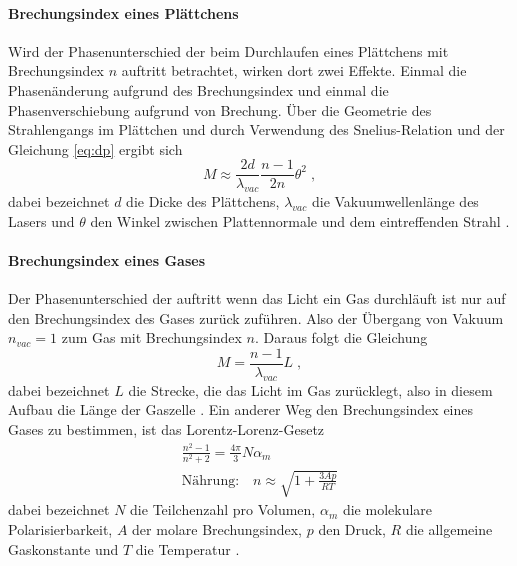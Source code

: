 \paragraph{Brechungsindex eines Plättchens}
Wird der Phasenunterschied der beim Durchlaufen eines Plättchens mit Brechungsindex $n$ auftritt betrachtet,
wirken dort zwei Effekte. Einmal die Phasenänderung aufgrund des Brechungsindex und einmal die
Phasenverschiebung aufgrund von Brechung. Über die Geometrie des Strahlengangs im Plättchen und durch
Verwendung des Snelius-Relation und der Gleichung \eqref{eq:dp} ergibt sich
\begin{equation}
M \approx \frac{2d}{\lambda_{vac}} \frac{n-1}{2n} \theta^2 \; ,
\label{eq:pM}
\end{equation}
dabei bezeichnet $d$ die Dicke des Plättchens, $\lambda_{vac}$ die Vakuumwellenlänge des Lasers und $\theta$ den
Winkel zwischen Plattennormale und dem eintreffenden Strahl \cite{Anleitung}.
\paragraph{Brechungsindex eines Gases}
Der Phasenunterschied der auftritt wenn das Licht ein Gas durchläuft ist nur auf den Brechungsindex des
Gases zurück zuführen. Also der Übergang von Vakuum $n_{vac}= 1$ zum Gas mit Brechungsindex $n$. Daraus folgt
die Gleichung
\begin{equation}
M = \frac{n-1}{\lambda_{vac}} L \; ,
\label{eq:lM}
\end{equation}
dabei bezeichnet $L$ die Strecke, die das Licht im Gas zurücklegt, also in diesem Aufbau die Länge der Gaszelle
\cite{Anleitung}. Ein anderer Weg den Brechungsindex eines Gases zu bestimmen, ist das Lorentz-Lorenz-Gesetz
\begin{gather}
\frac{n^2 -1}{n^2 +2} = \frac{4\pi}{3} N \alpha_m \\
\text{Nährung:} \quad n \approx \sqrt{1+ \frac{3Ap}{RT}}
\label{eq:NLL}
\end{gather}
dabei bezeichnet $N$ die Teilchenzahl pro Volumen, $\alpha_m$ die molekulare Polarisierbarkeit, $A$ der
molare Brechungsindex, $p$ den Druck, $R$ die allgemeine Gaskonstante und $T$ die Temperatur
\cite{LLG}.
